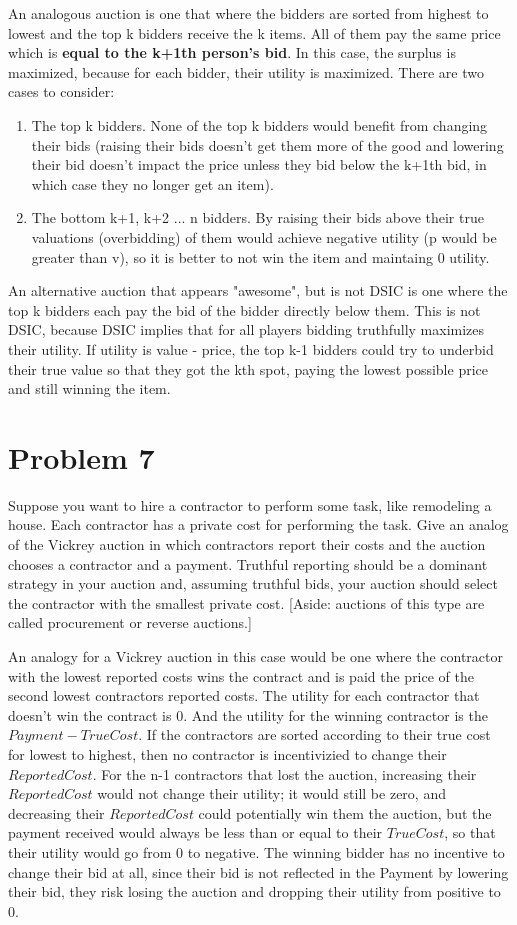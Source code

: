 \documentclass{article}
\begin{document}
An analogous auction is one that where the bidders are sorted from highest to
lowest and the top k bidders receive the k items.  All of them pay the same
price which is \textbf{equal to the k+1th person's bid}. In this case, the surplus is
maximized, because for each bidder, their utility is maximized. There are two
cases to consider:
\begin{enumerate} 
\item The top k bidders. None of the top k bidders would benefit from changing their bids (raising their bids
doesn't get them more of the good and lowering their bid doesn't impact
the price unless they bid below the k+1th bid, in which case they no longer
get an item). 
\item The bottom k+1, k+2 ... n bidders.  By raising their bids above their
	true valuations (overbidding) of them would achieve negative utility (p
		would be greater than v), so it is better to not win the item and
		maintaing 0 utility.
		
\end{enumerate}

An alternative auction that appears "awesome", but is not DSIC is one where
the top k bidders each pay the bid of the bidder directly below them.  This is not DSIC, because DSIC implies that for all players bidding truthfully
maximizes their utility.  If utility is value - price, the top k-1 bidders
could try to underbid their true value so that they got the kth spot, paying
the lowest possible price and still winning the item.

\section*{Problem 7}
Suppose you want to hire a contractor to perform some task, like remodeling a house. Each contractor has a private cost for performing the task. Give an analog of the Vickrey auction in which contractors report their costs and the auction chooses a contractor and a payment. Truthful reporting should be a dominant strategy in your auction and, assuming truthful bids, your auction should select the contractor with the smallest private cost.
[Aside: auctions of this type are called procurement or reverse auctions.]

An analogy for a Vickrey auction in this case would be one where the
contractor with the lowest reported costs wins the contract and is paid the
price of the second lowest contractors reported costs.  The utility for each
contractor that doesn't win the contract is 0.  And the utility for the
winning contractor is the $Payment - TrueCost$.  If the contractors are sorted
according to their true cost for lowest to highest, then no contractor is
incentivizied to change their $ReportedCost$.  For the n-1 contractors that
lost the auction, increasing their $ReportedCost$ would not change their
utility; it would still be zero, and decreasing their $ReportedCost$ could
potentially win them the auction, but the payment received would always be
less than or equal to their $TrueCost$, so that their utility would go from 0
to negative.  The winning bidder has no incentive to change their bid at all,
since their bid is not reflected in the Payment by lowering their bid, they
risk losing the auction and dropping their utility from positive to 0.
\end{document}
